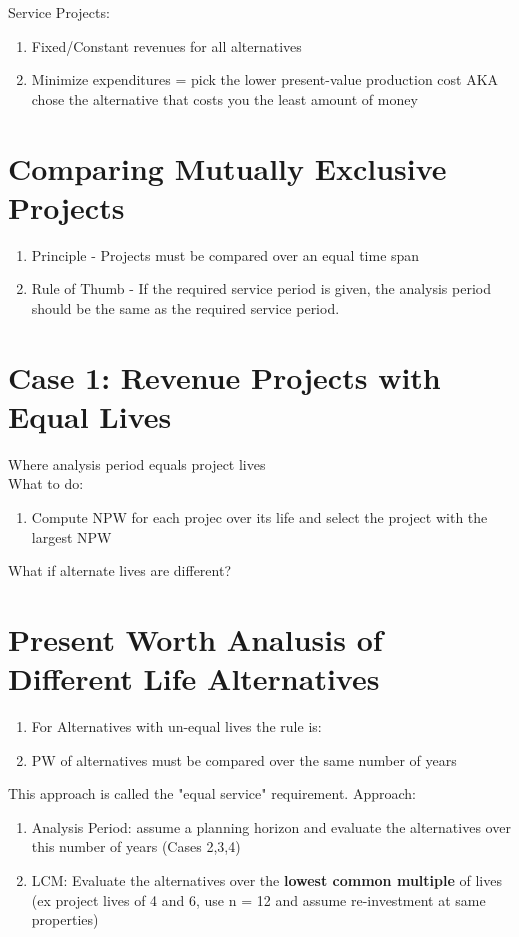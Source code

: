 \documentclass{report} %
\begin{document}
Service Projects:
\begin{enumerate}
    \item Fixed/Constant revenues for all alternatives
    \item Minimize expenditures = pick the lower present-value production cost AKA chose the alternative that costs you the least amount of money
\end{enumerate}

\section*{Comparing Mutually Exclusive Projects}
\begin{enumerate}
    \item Principle - Projects must be compared over an equal time span
    \item Rule of Thumb - If the required service period is given, the analysis period should be the same as the required service period.
\end{enumerate}

\section*{Case 1: Revenue Projects with Equal Lives}
Where analysis period equals project lives \\
What to do:
\begin{enumerate}
    \item Compute NPW for each projec over its life and select the project with the largest NPW
\end{enumerate}
What if alternate lives are different?
\section*{Present Worth Analusis of Different Life Alternatives}
\begin{enumerate}
    \item For Alternatives with un-equal lives the rule is:
    \item PW of alternatives must be compared over the same number of years
\end{enumerate}
This approach is called the "equal service" requirement.
Approach:
\begin{enumerate}
    \item Analysis Period: assume a planning horizon and evaluate the alternatives over this number of years (Cases 2,3,4)
    \item LCM: Evaluate the alternatives over the \textbf{lowest common multiple} of lives (ex project lives of 4 and 6, use n = 12 and assume re-investment at same properties)
\end{enumerate}
\end{document}
